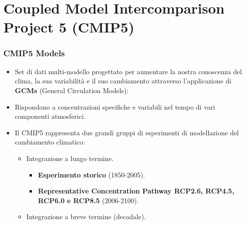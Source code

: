 \section{Coupled Model Intercomparison Project 5 (CMIP5)}

\begin{frame} \frametitle{CMIP5 Models} { \fontsize{13pt}{14}\selectfont	

\begin{itemize} \setlength\itemsep{10pt}

    \item<1-> Set di dati multi-modello progettato per aumentare la nostra conoscenza del clima, la sua variabilità e il suo cambiamento attraverso l'applicazione di \textbf{GCMs} (General Circulation Models):
    \item<2-> Rispondono a concentrazioni specifiche e variabili nel tempo di vari componenti atmosferici.
	\item<3-> Il CMIP5 rappresenta due grandi gruppi di esperimenti di modellazione del cambiamento climatico:
	\begin{itemize}
        \item<4-> {\fontsize{12pt}{14}\selectfont Integrazione a lungo termine.}
	       \begin{itemize}
	           \item \textbf{Esperimento storico} (1850-2005).
	           \item \textbf{Representative Concentration Pathway  RCP2.6, RCP4.5, RCP6.0 e RCP8.5} (2006-2100).
	       \end{itemize}
	    \item<4-> {\fontsize{12pt}{14}\selectfont Integrazione a breve termine (decadale).}
	\end{itemize}  
\end{itemize}
	
}	
\end{frame}



